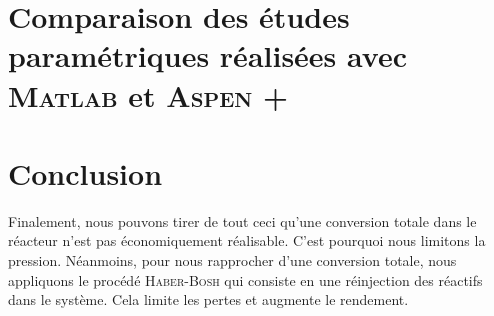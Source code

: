 \documentclass[11pt,a4paper]{report}
\begin{document}
\section{Comparaison des études paramétriques réalisées avec \textsc{Matlab} et \textsc{Aspen +}}

\section{Conclusion} Finalement, nous pouvons tirer de tout ceci qu'une conversion totale dans le réacteur n'est
pas économiquement réalisable. C'est pourquoi nous limitons la pression. Néanmoins, pour nous rapprocher d'une 
conversion totale, nous appliquons le procédé \textsc{Haber-Bosh} qui consiste en une réinjection des réactifs dans le système. 
Cela limite les pertes et augmente le rendement.
\end{document}
